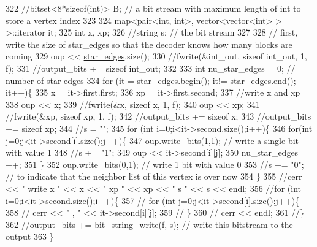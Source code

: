 \begin{DoxyCode}
322   \textcolor{comment}{//bitset<8*sizeof(int)> B; // a bit stream with maximum length of int to store a vertex index}
323 
324   map<pair<int, int>, vector<vector<int> > >::iterator it;
325   \textcolor{keywordtype}{int} x, xp;
326   \textcolor{comment}{//string s; // the bit stream}
327 
328   \textcolor{comment}{// first, write the size of star\_edges so that the decoder knows how many blocks are coming}
329   oup << \hyperlink{classmarked__graph__compressed_a7df5779d313486644132bd816937f532}{star\_edges}.size();
330   \textcolor{comment}{//fwrite(&int\_out, sizeof int\_out, 1, f);}
331   \textcolor{comment}{//output\_bits += sizeof int\_out;}
332 
333   \textcolor{keywordtype}{int} nu\_star\_edges = 0; \textcolor{comment}{// number of star edges }
334   \textcolor{keywordflow}{for} (it = \hyperlink{classmarked__graph__compressed_a7df5779d313486644132bd816937f532}{star\_edges}.begin(); it!= \hyperlink{classmarked__graph__compressed_a7df5779d313486644132bd816937f532}{star\_edges}.end(); it++)\{
335     x = it->first.first;
336     xp = it->first.second;
337     \textcolor{comment}{//write x and xp}
338     oup << x;
339     \textcolor{comment}{//fwrite(&x, sizeof x, 1, f);}
340     oup << xp;
341     \textcolor{comment}{//fwrite(&xp, sizeof xp, 1, f);}
342     \textcolor{comment}{//output\_bits += sizeof x;}
343     \textcolor{comment}{//output\_bits += sizeof xp;}
344     \textcolor{comment}{//s = "";}
345     \textcolor{keywordflow}{for} (\textcolor{keywordtype}{int} i=0;i<it->second.size();i++)\{
346       \textcolor{keywordflow}{for}(\textcolor{keywordtype}{int} j=0;j<it->second[i].size();j++)\{
347         oup.write\_bits(1,1); \textcolor{comment}{// write a single bit with value 1}
348         \textcolor{comment}{//s += "1";}
349         oup <<  it->second[i][j]; 
350         nu\_star\_edges ++;
351       \}
352       oup.write\_bits(0,1); \textcolor{comment}{// write 1 bit with value 0 }
353       \textcolor{comment}{//s += "0"; // to indicate that the neighbor list of this vertex is over now}
354     \}
355     \textcolor{comment}{//cerr << " write  x " << x << " xp " << xp << " s " << s << endl;}
356     \textcolor{comment}{//for (int i=0;i<it->second.size();i++)\{}
357     \textcolor{comment}{//  for (int j=0;j<it->second[i].size();j++)\{}
358     \textcolor{comment}{//    cerr << " , " << it->second[i][j];}
359     \textcolor{comment}{//  \}}
360     \textcolor{comment}{//  cerr << endl;}
361     \textcolor{comment}{//\}}
362     \textcolor{comment}{//output\_bits += bit\_string\_write(f, s); // write this bitstream to the output}
363   \}

\end{DoxyCode}
